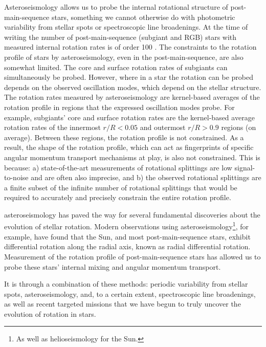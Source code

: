 Asteroseismology allows us to probe the internal rotational structure of post-main-sequence stars, something we cannot otherwise do with photometric variability from stellar spots or spectroscopic line broadenings.
At the time of writing the number of post-main-sequence (subgiant and RGB) stars with measured internal rotation rates is of order 100 \citep[see, e.g.,][]{deheuvels_seismic_2014,gehan_measuring_2019,li_asteroseismology_2020,li_asteroseismology_2020-1,moyano_asteroseismology_2022}.
The constraints to the rotation profile of stars by asteroseismology, even in the post-main-sequence, are also somewhat limited.
The core and surface rotation rates of subgiants can simultaneously be probed.
However, where in a star the rotation can be probed depends on the observed oscillation modes, which depend on the stellar structure.
The rotation rates measured by asteroseismology are kernel-based averages of the rotation profile in regions that the expressed oscillation modes probe.
For example, subgiants' core and surface rotation rates are the kernel-based average rotation rates of the innermost $r/R<0.05$ and outermost $r/R>0.9$ regions (on average).
Between these regions, the rotation profile is not constrained.
As a result, the shape of the rotation profile, which can act as fingerprints of specific angular momentum transport mechanisms at play, is also not constrained.
This is because: a) state-of-the-art measurements of rotational splittings are low signal-to-noise and are often also imprecise, and b) the observed rotational splittings are a finite subset of the infinite number of rotational splittings that would be required to accurately and precisely constrain the entire rotation profile.

asteroseismology has paved the way for several fundamental discoveries about the evolution of stellar rotation.
Modern observations using asteroseismology\footnote{As well as helioseismology for the Sun.}, for example, have found that the Sun, and most post-main-sequence stars, exhibit differential rotation along the radial axis, known as radial differential rotation.
Measurement of the rotation profile of post-main-sequence stars has allowed us to probe these stars' internal mixing and angular momentum transport. 

It is through a combination of these methods: periodic variability from stellar spots, asteroseismology, and, to a certain extent, spectroscopic line broadenings, as well as recent targeted missions that we have begun to truly uncover the evolution of rotation in stars.

